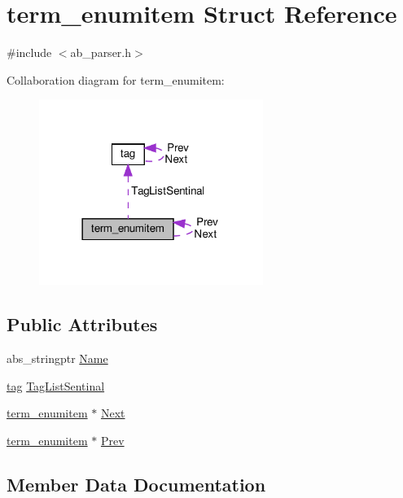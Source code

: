 \hypertarget{structterm__enumitem}{}\section{term\+\_\+enumitem Struct Reference}
\label{structterm__enumitem}


{\ttfamily \#include $<$ab\+\_\+parser.\+h$>$}



Collaboration diagram for term\+\_\+enumitem\+:
\nopagebreak
\begin{figure}[H]
\begin{center}
\leavevmode
\includegraphics[width=206pt]{dc/def/structterm__enumitem__coll__graph}
\end{center}
\end{figure}
\subsection*{Public Attributes}
\begin{DoxyCompactItemize}
\item 
abs\+\_\+stringptr \hyperlink{structterm__enumitem_a0e4d6c8b5e13dc1a983acfad9479248b}{Name}
\item 
\hyperlink{structtag}{tag} \hyperlink{structterm__enumitem_ace61cab8da4a090548e03c7a9970deb1}{Tag\+List\+Sentinal}
\item 
\hyperlink{structterm__enumitem}{term\+\_\+enumitem} $\ast$ \hyperlink{structterm__enumitem_a76a5df14c05395f4737800d06c23611a}{Next}
\item 
\hyperlink{structterm__enumitem}{term\+\_\+enumitem} $\ast$ \hyperlink{structterm__enumitem_a9841d521b128ff1d85936bdfded2e425}{Prev}
\end{DoxyCompactItemize}


\subsection{Member Data Documentation}
\mbox{\label{structterm__enumitem_a0e4d6c8b5e13dc1a983acfad9479248b}} 
